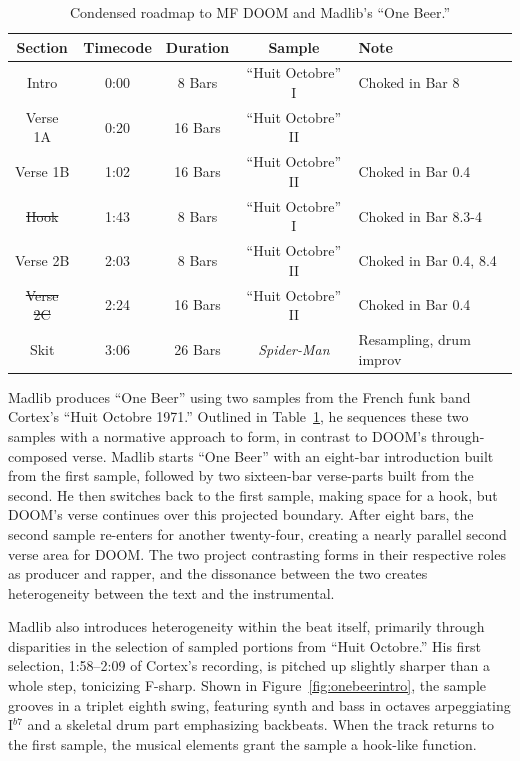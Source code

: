     \begin{table}[ht]
        \centering
            \begin{tabular}{|c|c|c|c|l|}
                 \hline
                  Section         & Timecode & Duration & Sample              & Note                    \\ \hline
                  Intro           & 0:00     & 8 Bars   & ``Huit Octobre'' I  & Choked in Bar 8         \\ \hline
                  Verse 1A        & 0:20     & 16 Bars  & ``Huit Octobre'' II &                         \\ \hline
                  Verse 1B        & 1:02     & 16 Bars  & ``Huit Octobre'' II & Choked in Bar 0.4       \\ \hline
                  \sout{Hook}     & 1:43     & 8 Bars   & ``Huit Octobre'' I  & Choked in Bar 8.3-4     \\ \hline
                  Verse 2B        & 2:03     & 8 Bars   & ``Huit Octobre'' II & Choked in Bar 0.4, 8.4  \\ \hline
                  \sout{Verse 2C} & 2:24     & 16 Bars  & ``Huit Octobre'' II & Choked in Bar 0.4       \\ \hline
                  Skit            & 3:06     & 26 Bars  & \textit{Spider-Man} & Resampling, drum improv \\ \hline
             \end{tabular}
        \caption{Condensed roadmap to MF DOOM and Madlib's ``One Beer.''}
        \label{tab:onebeer}
    \end{table}

Madlib produces ``One Beer'' using two samples from the French funk band Cortex's ``Huit Octobre
1971.'' Outlined in Table~\ref{tab:onebeer}, he sequences these two samples with a normative 
approach to form, in contrast to DOOM's through-composed verse. Madlib starts ``One Beer'' with
an eight-bar introduction built from the first sample, followed by two sixteen-bar verse-parts
built from the second. He then switches back to the first sample, making space for a hook, 
but DOOM's verse continues over this projected boundary. After eight bars, the second sample
re-enters for another twenty-four, creating a nearly parallel second verse area for DOOM. The
two project contrasting forms in their respective roles as producer and rapper, and the dissonance
between the two creates heterogeneity between the text and the instrumental.

Madlib also introduces heterogeneity within the beat itself, primarily through disparities
in the selection of sampled portions from ``Huit Octobre.'' His first selection, 1:58--2:09
of  Cortex's recording, is pitched up slightly sharper than a whole step, tonicizing F-sharp.
Shown in Figure~\ref{fig:onebeerintro}, the sample grooves in a triplet eighth swing, featuring
synth and bass  in octaves arpeggiating I$^{b7}$ and a skeletal drum part emphasizing backbeats.
When the track returns to the first sample, the musical elements grant the sample a 
hook-like function.

